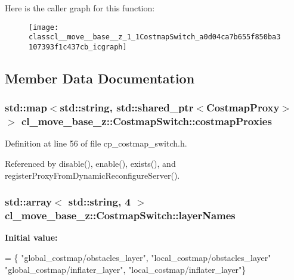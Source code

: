 Here is the caller graph for this function\+:
\nopagebreak
\begin{figure}[H]
\begin{center}
\leavevmode
\texttt{[image: classcl\_\_move\_\_base\_\_z\_1\_1CostmapSwitch\_a0d04ca7b655f850ba3107393f1c437cb\_icgraph]}
\end{center}
\end{figure}




\subsection{Member Data Documentation}
\subsubsection[{\texorpdfstring{costmap\+Proxies}{costmapProxies}}]{\setlength{\rightskip}{0pt plus 5cm}std\+::map$<$std\+::string, std\+::shared\+\_\+ptr$<${\bf Costmap\+Proxy}$>$ $>$ cl\+\_\+move\+\_\+base\+\_\+z\+::\+Costmap\+Switch\+::costmap\+Proxies\hspace{0.3cm}{\ttfamily [private]}}\hypertarget{classcl__move__base__z_1_1CostmapSwitch_a3a574ac1f7f3eff19cdf7ad0e15297e4}{}\label{classcl__move__base__z_1_1CostmapSwitch_a3a574ac1f7f3eff19cdf7ad0e15297e4}


Definition at line 56 of file cp\+\_\+costmap\+\_\+switch.\+h.



Referenced by disable(), enable(), exists(), and register\+Proxy\+From\+Dynamic\+Reconfigure\+Server().

\subsubsection[{\texorpdfstring{layer\+Names}{layerNames}}]{\setlength{\rightskip}{0pt plus 5cm}std\+::array$<$ std\+::string, 4 $>$ cl\+\_\+move\+\_\+base\+\_\+z\+::\+Costmap\+Switch\+::layer\+Names\hspace{0.3cm}{\ttfamily [static]}}\hypertarget{classcl__move__base__z_1_1CostmapSwitch_aee0c75c8f4459cacaf583ef8c90ff329}{}\label{classcl__move__base__z_1_1CostmapSwitch_aee0c75c8f4459cacaf583ef8c90ff329}
{\bfseries Initial value\+:}
\begin{DoxyCode}
=
        \{
            \textcolor{stringliteral}{"global\_costmap/obstacles\_layer"},
            \textcolor{stringliteral}{"local\_costmap/obstacles\_layer"}
            \textcolor{stringliteral}{"global\_costmap/inflater\_layer"},
            \textcolor{stringliteral}{"local\_costmap/inflater\_layer"}\}
\end{DoxyCode}


